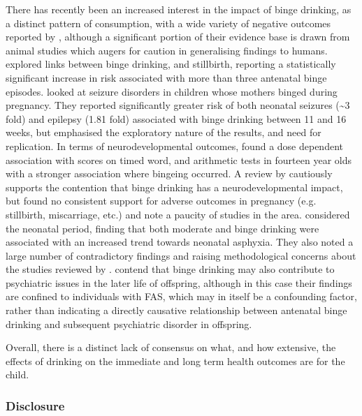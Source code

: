 There has recently been an increased interest in the impact of binge
drinking, as a distinct pattern of consumption, with a wide variety
of negative outcomes reported by \citet{Maier2001}, although a significant
portion of their evidence base is drawn from animal studies which
augers for caution in generalising findings to humans. \citet{Strandberg-larsen2008}
explored links between binge drinking, and stillbirth, reporting a
statistically significant increase in risk associated with more than
three antenatal binge episodes. \citet{Sun2009} looked at seizure
disorders in children whose mothers binged during pregnancy. They
reported significantly greater risk of both neonatal seizures (\textasciitilde{}3
fold) and epilepsy (1.81 fold) associated with binge drinking between
11 and 16 weeks, but emphasised the exploratory nature of the results,
and need for replication. In terms of neurodevelopmental outcomes,
\citet{Streissguth1994} found a dose dependent association with scores
on timed word, and arithmetic tests in fourteen year olds with a stronger
association where bingeing occurred. A review by \citet{Henderson2007}
cautiously supports the contention that binge drinking has a neurodevelopmental
impact, but found no consistent support for adverse outcomes in pregnancy
(e.g. stillbirth, miscarriage, etc.) and note a paucity of studies
in the area. \citet{Meyer-Leu2011} considered the neonatal period,
finding that both moderate and binge drinking were associated with
an increased trend towards neonatal asphyxia. They also noted a large
number of contradictory findings and raising methodological concerns
about the studies reviewed by \citeauthor{Henderson2007}. \citet{Barr2006}
contend that binge drinking may also contribute to psychiatric issues
in the later life of offspring, although in this case their findings
are confined to individuals with \ac{FAS}, which may in itself be
a confounding factor, rather than indicating a directly causative
relationship between antenatal binge drinking and subsequent psychiatric
disorder in offspring.

Overall, there is a distinct lack of consensus on what, and how extensive,
the effects of drinking on the immediate and long term health outcomes
are for the child. 


\subsubsection{Disclosure}



